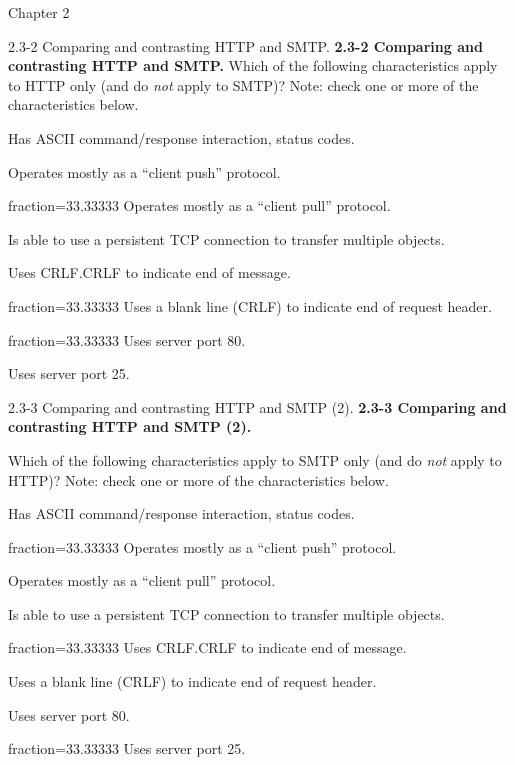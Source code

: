 \documentclass[11pt]{article}
\begin{document}
\begin{quiz}{Chapter 2}
\begin{multi}[points=1,shuffle,multiple]{2.3-2 Comparing and contrasting HTTP and SMTP.}
\textbf{2.3-2 Comparing and contrasting HTTP and SMTP.} 
Which of the following characteristics apply to HTTP only (and do \emph{not} apply to SMTP)?  
Note: check one or more of the characteristics below.

\item Has ASCII command/response interaction, status codes.
\item Operates mostly as a ``client push'' protocol.
\item[fraction=33.33333] Operates mostly as a ``client pull'' protocol.
\item Is able to use a persistent TCP connection to transfer multiple objects.
\item Uses CRLF.CRLF to indicate end of message.
\item[fraction=33.33333] Uses a blank line (CRLF) to indicate end of request header.
\item[fraction=33.33333] Uses server port 80.
\item Uses server port 25.
\end{multi}

\begin{multi}[points=1,shuffle,multiple]{2.3-3 Comparing and contrasting HTTP and SMTP (2).}
\textbf{2.3-3 Comparing and contrasting HTTP and SMTP (2).} 

Which of the following characteristics apply to SMTP only (and do \emph{not} apply to HTTP)?  
Note: check one or more of the characteristics below.
\item Has ASCII command/response interaction, status codes.
\item[fraction=33.33333] Operates mostly as a ``client push'' protocol.
\item Operates mostly as a ``client pull'' protocol.
\item Is able to use a persistent TCP connection to transfer multiple objects.
\item[fraction=33.33333] Uses CRLF.CRLF to indicate end of message.
\item Uses a blank line (CRLF) to indicate end of request header.
\item Uses server port 80.
\item[fraction=33.33333] Uses server port 25.
\end{multi}


\end{quiz}
\end{document}
